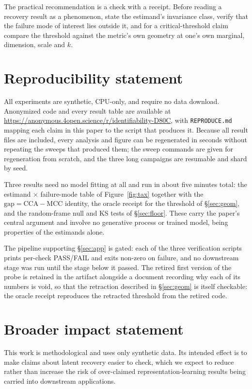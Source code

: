 \documentclass[10pt]{article}
\newcommand{\gap}{\ensuremath{\mathrm{CCA}\!-\!\mathrm{MCC}}}
\begin{document}
The practical recommendation is a check with a receipt. Before reading a recovery result as a
phenomenon, state the estimand's invariance class, verify that the failure mode of interest lies
outside it, and for a critical-threshold claim compare the threshold against the metric's own geometry
at one's own marginal, dimension, scale and $k$.

\section*{Reproducibility statement}

All experiments are synthetic, CPU-only, and require no data download. Anonymized
code and every result table are available at
\url{https://anonymous.4open.science/r/identifiability-D80C}, with \texttt{REPRODUCE.md}
mapping each claim in this paper to the script that produces it. Because all
result files are included, every analysis and figure can be regenerated in seconds
without repeating the sweeps that produced them; the sweep commands are given for
regeneration from scratch, and the three long campaigns are resumable and shard by
seed.

Three results need no model fitting at all and run in about five minutes total:
the estimand $\times$ failure-mode table of Figure~\ref{fig:tax} together with the
$\text{gap}=\gap$ identity, the oracle receipt for the threshold of
\S\ref{sec:geom}, and the random-frame null and KS tests of \S\ref{sec:floor}.
These carry the paper's central argument and involve no generative process or
trained model, being properties of the estimands alone.

The pipeline supporting \S\ref{sec:app} is gated: each of the three verification
scripts prints per-check PASS/FAIL and exits non-zero on failure, and no
downstream stage was run until the stage below it passed. The retired first
version of the probe is retained in the artifact alongside a document recording
why each of its numbers is void, so that the retraction described in
\S\ref{sec:geom} is itself checkable: the oracle receipt reproduces the retracted
threshold from the retired code.

\section*{Broader impact statement}

This work is methodological and uses only synthetic data. Its intended effect is to make claims about
latent recovery easier to check, which we expect to reduce rather than increase the risk of over-claimed
representation-learning results being carried into downstream applications.



\end{document}
